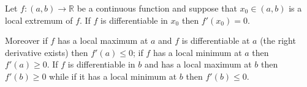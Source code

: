 \documentclass[12pt]{article}
\begin{document}
Let $f\colon (a,b)\to \mathbb R$ be a continuous function and suppose that 
$x_0\in (a,b)$ is a local extremum of $f$. If $f$ is differentiable in $x_0$ then $f'(x_0)=0$.

Moreover if $f$ has a local maximum at $a$ and $f$ is differentiable at $a$ (the right derivative exists) 
then $f'(a)\le 0$; if $f$ has a local minimum at $a$ then $f'(a)\ge 0$. 
If $f$ is differentiable in $b$ and
has a local maximum at $b$ then $f'(b)\ge 0$ while if it has a local minimum at $b$ then $f'(b)\le 0$.
\end{document}
